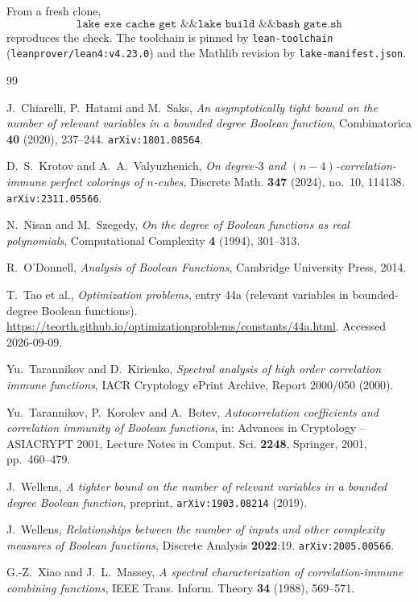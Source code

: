 \documentclass[11pt,reqno]{amsart}
\theoremstyle{plain}
\theoremstyle{definition}
\numberwithin{theorem}{section}
\begin{document}
From a fresh clone,
\[
  \texttt{lake exe cache get \&\& lake build \&\& bash gate.sh}
\]
reproduces the check. The toolchain is pinned by \texttt{lean-toolchain}
(\texttt{leanprover/lean4:v4.23.0}) and the Mathlib revision by \texttt{lake-manifest.json}.

\begin{thebibliography}{99}

J.~Chiarelli, P.~Hatami and M.~Saks,
\emph{An asymptotically tight bound on the number of relevant variables in a bounded degree
Boolean function},
Combinatorica \textbf{40} (2020), 237--244.
\texttt{arXiv:1801.08564}.

D.~S.~Krotov and A.~A.~Valyuzhenich,
\emph{On degree-$3$ and $(n-4)$-correlation-immune perfect colorings of $n$-cubes},
Discrete Math. \textbf{347} (2024), no.~10, 114138.
\texttt{arXiv:2311.05566}.

N.~Nisan and M.~Szegedy,
\emph{On the degree of Boolean functions as real polynomials},
Computational Complexity \textbf{4} (1994), 301--313.

R.~O'Donnell,
\emph{Analysis of Boolean Functions},
Cambridge University Press, 2014.

T.~Tao et al.,
\emph{Optimization problems}, entry 44a (relevant variables in bounded-degree Boolean
functions).
\url{https://teorth.github.io/optimizationproblems/constants/44a.html}.
Accessed 2026-09-09.

Yu.~Tarannikov and D.~Kirienko,
\emph{Spectral analysis of high order correlation immune functions},
IACR Cryptology ePrint Archive, Report 2000/050 (2000).

Yu.~Tarannikov, P.~Korolev and A.~Botev,
\emph{Autocorrelation coefficients and correlation immunity of Boolean functions},
in: Advances in Cryptology -- ASIACRYPT 2001, Lecture Notes in Comput. Sci. \textbf{2248},
Springer, 2001, pp.~460--479.

J.~Wellens,
\emph{A tighter bound on the number of relevant variables in a bounded degree Boolean
function},
preprint, \texttt{arXiv:1903.08214} (2019).

J.~Wellens,
\emph{Relationships between the number of inputs and other complexity measures of Boolean
functions},
Discrete Analysis \textbf{2022}:19.
\texttt{arXiv:2005.00566}.

G.-Z.~Xiao and J.~L.~Massey,
\emph{A spectral characterization of correlation-immune combining functions},
IEEE Trans. Inform. Theory \textbf{34} (1988), 569--571.

\end{thebibliography}
\end{document}
